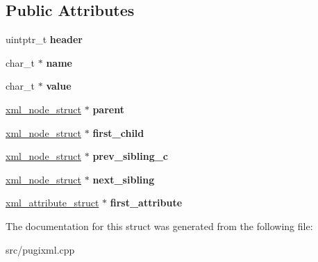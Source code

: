 \subsection*{Public Attributes}
\begin{DoxyCompactItemize}
\item 
\mbox{\label{structpugi_1_1xml__node__struct_aea2e405a368dc5a278a2d23465f1975c}} 
uintptr\+\_\+t {\bfseries header}
\item 
\mbox{\label{structpugi_1_1xml__node__struct_ae2324fdbd1e307fb12007d1d0f957a0b}} 
char\+\_\+t $\ast$ {\bfseries name}
\item 
\mbox{\label{structpugi_1_1xml__node__struct_a191e708864fccda17bb66157afdadd2d}} 
char\+\_\+t $\ast$ {\bfseries value}
\item 
\mbox{\label{structpugi_1_1xml__node__struct_af692c222bcc5a9f61108cb3ae0b7b5ea}} 
\hyperlink{structpugi_1_1xml__node__struct}{xml\+\_\+node\+\_\+struct} $\ast$ {\bfseries parent}
\item 
\mbox{\label{structpugi_1_1xml__node__struct_af72c49a0f81928ef664d9d2f0260f23d}} 
\hyperlink{structpugi_1_1xml__node__struct}{xml\+\_\+node\+\_\+struct} $\ast$ {\bfseries first\+\_\+child}
\item 
\mbox{\label{structpugi_1_1xml__node__struct_a74e62128c88c422c0ed969633bbb2d4e}} 
\hyperlink{structpugi_1_1xml__node__struct}{xml\+\_\+node\+\_\+struct} $\ast$ {\bfseries prev\+\_\+sibling\+\_\+c}
\item 
\mbox{\label{structpugi_1_1xml__node__struct_acf0867e3a77871e37132046d97398a6d}} 
\hyperlink{structpugi_1_1xml__node__struct}{xml\+\_\+node\+\_\+struct} $\ast$ {\bfseries next\+\_\+sibling}
\item 
\mbox{\label{structpugi_1_1xml__node__struct_a482d2daf97ce0745661cb2c57d8f6fb3}} 
\hyperlink{structpugi_1_1xml__attribute__struct}{xml\+\_\+attribute\+\_\+struct} $\ast$ {\bfseries first\+\_\+attribute}
\end{DoxyCompactItemize}


The documentation for this struct was generated from the following file\+:\begin{DoxyCompactItemize}
\item 
src/pugixml.\+cpp\end{DoxyCompactItemize}

